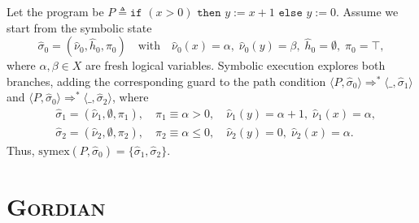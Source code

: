 \documentclass[acmsmall]{acmart}
\newcommand{\projName}{\textsc{Gordian}\xspace}
\theoremstyle{definition}
\begin{document}
\begin{example}
Let the program be $P \triangleq \texttt{if }(x > 0)\texttt{ then }y := x+1\texttt{ else }y := 0$. Assume we start from the symbolic state
\[
\hat\sigma_0=(\hat\nu_0,\hat h_0,\pi_0)
\quad\text{with}\quad
\hat\nu_0(x)=\alpha,\;\hat\nu_0(y)=\beta,\;\hat h_0=\emptyset,\;\pi_0=\top,
\]
where $\alpha,\beta\in X$ are fresh logical variables. Symbolic execution explores both branches, adding the corresponding guard to the path condition $\langle P,\hat\sigma_0\rangle \Rightarrow^{*} \langle \_,\hat\sigma_1\rangle$ and $\langle P,\hat\sigma_0\rangle \Rightarrow^{*} \langle \_,\hat\sigma_2\rangle$, where
\begin{align*}
&\hat\sigma_1 = (\hat\nu_1,\emptyset,\pi_1),
\quad
\pi_1 \equiv \alpha>0,
\quad
\hat\nu_1(y)=\alpha+1,\;\hat\nu_1(x)=\alpha,\\
&\hat\sigma_2 = (\hat\nu_2,\emptyset,\pi_2),
\quad
\pi_2 \equiv \alpha\le 0,
\quad
\hat\nu_2(y)=0,\;\hat\nu_2(x)=\alpha.
\end{align*}
Thus, $\mathrm{symex}(P,\hat\sigma_0)=\{\hat\sigma_1,\hat\sigma_2\}$.
\end{example}

\section{\projName}
\end{document}
